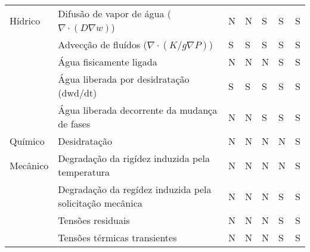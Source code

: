 {\begin{landscape}
\begin{tabular}{lllllll}
Hídrico  & Difusão de vapor de água ($\nabla· (D \nabla w)$)                     & N    & N     & S        & S         & S         \\
         & Advecção de fluídos ($\nabla \cdot (K/g \nabla P)$)                        & S    & S     & S        & S         & S         \\
         & Água fisicamente ligada                                  & N    & N     & N        & S         & S         \\
         & Água liberada por desidratação (dwd/dt)                  & S    & S     & S        & S         & S         \\
         & Água liberada decorrente da mudança de fases             & N    & N     & S        & S         & S         \\
Químico  & Desidratação                                             & N    & N     & N        & N         & S         \\
Mecânico & Degradação da rigídez induzida pela temperatura          & N    & N     & N        & N         & S         \\
         & Degradação da regídez induzida pela solicitação mecânica & N    & N     & N        & S         & S         \\
         & Tensões residuais                                        & N    & N     & N        & S         & S         \\
         & Tensões térmicas transientes                             & N    & N     & N        & S         & S        
\end{tabular}
 
    \end{landscape}
    \clearpage%
    }
   

    
